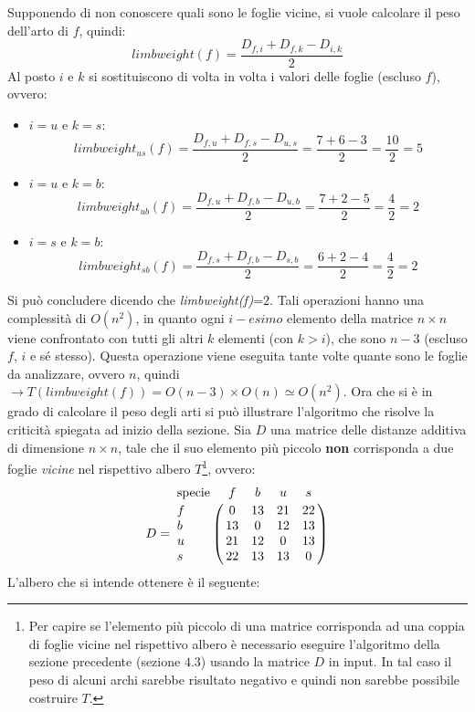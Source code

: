 Supponendo di non conoscere quali sono le foglie vicine, si vuole calcolare il peso dell'arto di $f$, quindi:
\[limbweight(f)=\frac{D_{f,i}+D_{f,k}-D_{i,k}}{2}\]
Al posto $i$ e $k$ si sostituiscono di volta in volta i valori delle foglie (escluso $f$), ovvero:
\begin{itemize}
	\item $i=u$ e $k=s$:
	\[limbweight_{us}(f)=\frac{D_{f,u}+D_{f,s}-D_{u,s}}{2}=\frac{7+6-3}{2}=\frac{10}{2}=5\]
	\item $i=u$ e $k=b$:
	\[limbweight_{ub}(f)=\frac{D_{f,u}+D_{f,b}-D_{u,b}}{2}=\frac{7+2-5}{2}=\frac{4}{2}=2\]
	\item $i=s$ e $k=b$:
	\[limbweight_{sb}(f)=\frac{D_{f,s}+D_{f,b}-D_{s,b}}{2}=\frac{6+2-4}{2}=\frac{4}{2}=2\]
\end{itemize}
Si può concludere dicendo che \textit{limbweight(f)}=$2$.
\newline
Tali operazioni hanno una complessità di $O(n^2)$, in quanto ogni $i-esimo$  elemento della matrice $n \times n$ viene confrontato con tutti gli altri $k$ elementi (con $k>i$), che sono $n-3$ (escluso $f$, $i$  e sé stesso). Questa operazione viene eseguita tante volte quante sono le foglie da analizzare, ovvero $n$, quindi $\rightarrow T(limbweight(f))=O(n-3)\times O(n)\simeq O(n^2)$.
\newline
Ora che si è in grado di calcolare il peso degli arti si può illustrare l'algoritmo che risolve la criticità spiegata ad inizio della sezione.
\newline
Sia $D$ una matrice delle distanze additiva di dimensione $n\times n$, tale che il suo elemento più piccolo \textbf{non} corrisponda a due foglie \textit{vicine} nel rispettivo albero $T$\footnote{Per capire se l'elemento più piccolo di una matrice corrisponda ad una coppia di foglie vicine nel rispettivo albero è necessario eseguire l'algoritmo della sezione precedente (sezione $4.3$) usando la matrice $D$ in input. In tal caso il peso di alcuni archi sarebbe risultato negativo e quindi non sarebbe possibile costruire $T$. }, ovvero:
\[
D = \bordermatrix{\text{specie}&f&b&u&s\cr
                f& 0 & 13 & 21 & 22\cr
                b& 13 & 0 & 12 & 13\cr
                u& 21 & 12 & 0 & 13\cr
                s& 22 & 13 & 13 & 0}
\]
\newpage
L'albero che si intende ottenere è il seguente:
